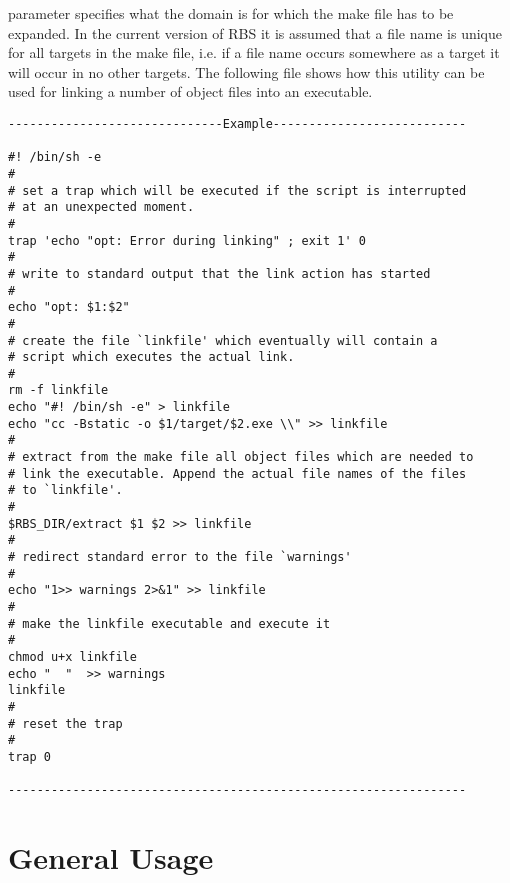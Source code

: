 parameter specifies what the domain is for which the make file has to be expanded. In the current version of RBS it is assumed that a file name is 
unique for all targets in the make file, i.e. if a file name occurs
somewhere as a target it will occur in no other targets.
The following file shows how this utility can be used for linking
a number of object files into an executable.
\begin{verbatim}
------------------------------Example---------------------------

#! /bin/sh -e
#
# set a trap which will be executed if the script is interrupted  
# at an unexpected moment.
#
trap 'echo "opt: Error during linking" ; exit 1' 0
#
# write to standard output that the link action has started
#
echo "opt: $1:$2"
#
# create the file `linkfile' which eventually will contain a 
# script which executes the actual link.
#
rm -f linkfile
echo "#! /bin/sh -e" > linkfile
echo "cc -Bstatic -o $1/target/$2.exe \\" >> linkfile
#
# extract from the make file all object files which are needed to 
# link the executable. Append the actual file names of the files 
# to `linkfile'. 
#
$RBS_DIR/extract $1 $2 >> linkfile
#
# redirect standard error to the file `warnings'
#
echo "1>> warnings 2>&1" >> linkfile
#
# make the linkfile executable and execute it
# 
chmod u+x linkfile
echo "  "  >> warnings
linkfile
#
# reset the trap
#
trap 0

----------------------------------------------------------------
\end{verbatim}
 
\section{General Usage}


